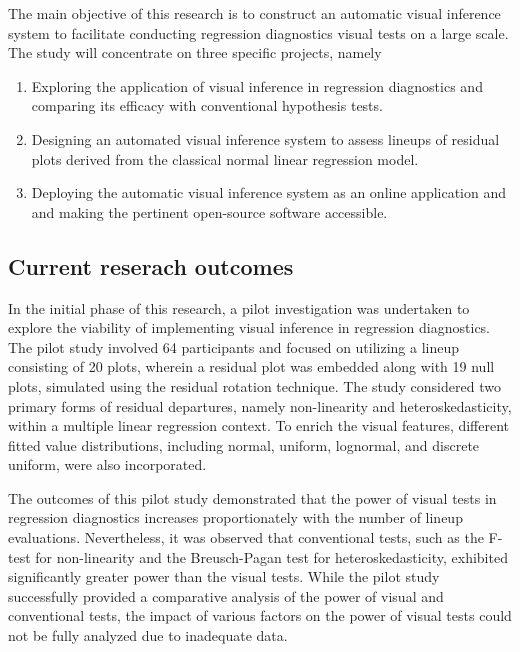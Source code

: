 \documentclass[11pt,a4paper,]{article}
\providecommand{\tightlist}{%
  \setlength{\itemsep}{0pt}\setlength{\parskip}{0pt}}
\begin{document}
The main objective of this research is to construct an automatic visual inference system to facilitate conducting regression diagnostics visual tests on a large scale. The study will concentrate on three specific projects, namely

\begin{enumerate}
\def\labelenumi{\arabic{enumi}.}
\tightlist
\item
  Exploring the application of visual inference in regression diagnostics and comparing its efficacy with conventional hypothesis tests.
\item
  Designing an automated visual inference system to assess lineups of residual plots derived from the classical normal linear regression model.
\item
  Deploying the automatic visual inference system as an online application and and making the pertinent open-source software accessible.
\end{enumerate}

\hypertarget{current-reserach-outcomes}{%
\subsection{Current reserach outcomes}\label{current-reserach-outcomes}}

In the initial phase of this research, a pilot investigation was undertaken to explore the viability of implementing visual inference in regression diagnostics. The pilot study involved 64 participants and focused on utilizing a lineup consisting of 20 plots, wherein a residual plot was embedded along with 19 null plots, simulated using the residual rotation technique. The study considered two primary forms of residual departures, namely non-linearity and heteroskedasticity, within a multiple linear regression context. To enrich the visual features, different fitted value distributions, including normal, uniform, lognormal, and discrete uniform, were also incorporated.

The outcomes of this pilot study demonstrated that the power of visual tests in regression diagnostics increases proportionately with the number of lineup evaluations. Nevertheless, it was observed that conventional tests, such as the F-test for non-linearity and the Breusch-Pagan test for heteroskedasticity, exhibited significantly greater power than the visual tests. While the pilot study successfully provided a comparative analysis of the power of visual and conventional tests, the impact of various factors on the power of visual tests could not be fully analyzed due to inadequate data.
\end{document}
